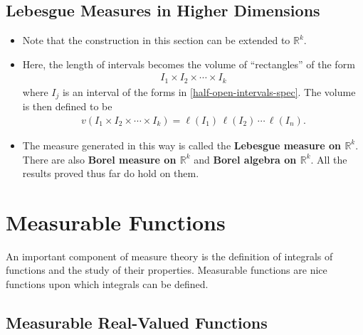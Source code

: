 \documentclass[10pt]{article}
\newcommand{\Real}{\mathbb{R}}
\begin{document}
\subsection{Lebesgue Measures in Higher Dimensions}

\begin{itemize}
  \item Note that the construction in this section can be extended to $\Real^k$.
  
  \item Here, the length of intervals becomes the volume of ``rectangles'' of the form
  \begin{align*}
    I_1 \times I_2 \times \dotsb \times I_k
  \end{align*}
  where $I_j$ is an interval of the forms in \eqref{half-open-intervals-spec}. The volume is then defined to be
  \begin{align*}
    v(I_1 \times I_2 \times \dotsb \times I_k) = \ell(I_1)\, \ell(I_2)\, \dotsb\, \ell(I_n).
  \end{align*}

  \item The measure generated in this way is called the {\bf Lebesgue measure on $\Real^k$}. There are also {\bf Borel measure on $\Real^k$} and {\bf Borel algebra on $\Real^k$}. All the results proved thus far do hold on them. 
\end{itemize}

\section{Measurable Functions}

An important component of measure theory is the definition of integrals of functions and the study of their properties. Measurable functions are nice functions upon which integrals can be defined. 

\subsection{Measurable Real-Valued Functions}
\end{document}
